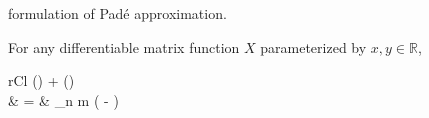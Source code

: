 formulation of Pad\'{e} approximation.
\begin{corollary}
	For any differentiable matrix function $X$ parameterized by $x,y \in \mathbb{R}$,
	\begin{IEEEeqnarray*}{rCl}
		{
			\left[\frac{\partial}{\partial x} \sum_{n=1}^\infty \frac{1}{\left(n+1\right)!} \operatorname{ad}_X^n \cdotp \right]\left(\right)
			+ \left[\frac{\partial}{\partial y} \sum_{n=1}^\infty \frac{1}{\left(n+1\right)!} \operatorname{ad}_X^n \cdotp \right]\left(\right)
		}\\\quad
			& = & \sum_{n \ge m }  \left( -  \right) 
	\end{IEEEeqnarray*}
\end{corollary}
